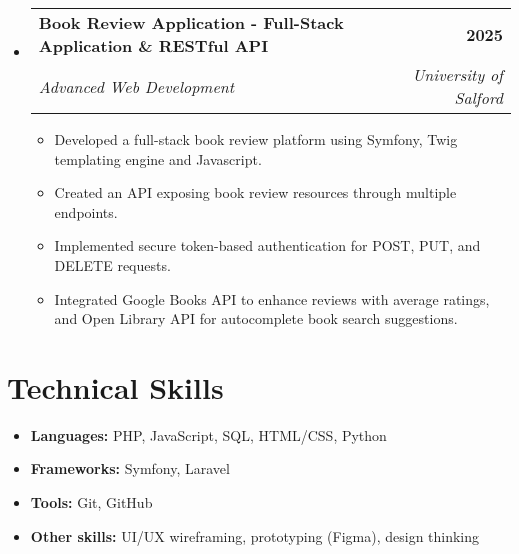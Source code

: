 \documentclass[a4paper,12pt]{article}
\makeatletter
\newcommand{\resumeSubHeadingListStart}{\begin{itemize}[leftmargin=0in, label={}]}
\newcommand{\resumeSubHeadingListEnd}{\end{itemize}}
\newcommand{\resumeSubheading}[4]{
  \item
    \begin{tabular*}{\textwidth}[t]{l@{\extracolsep{\fill}}r}
      \textbf{#1} & #2 \\
      \textit{#3} & \textit{#4} \\
    \end{tabular*}\vspace{-2pt}
}
\newcommand{\resumeItem}[1]{\item #1}
\newcommand{\resumeItemListStart}{\begin{itemize}[leftmargin=2em, label=\textbullet, itemsep=2pt]}
\newcommand{\resumeItemListEnd}{\end{itemize}}
\makeatother
\begin{document}
\pagebreak

\resumeSubHeadingListStart
    \resumeSubheading
    {Book Review Application - Full-Stack Application \& RESTful API}{\bfseries{2025}}
    {Advanced Web Development}{University of Salford}
        \resumeItemListStart
            \resumeItem{Developed a full-stack book review platform using Symfony, Twig templating engine and Javascript.}
            \resumeItem{Created an API exposing book review resources through multiple endpoints.}
            \resumeItem{Implemented secure token-based authentication for POST, PUT, and DELETE requests.}
            \resumeItem{Integrated Google Books API to enhance reviews with average ratings, and Open Library API for autocomplete book search suggestions.}
        \resumeItemListEnd
\resumeSubHeadingListEnd

\section{Technical Skills}
\resumeItemListStart
    \resumeItem{\textbf{Languages:} PHP, JavaScript, SQL, HTML/CSS, Python}
    \resumeItem{\textbf{Frameworks:} Symfony, Laravel}
    \resumeItem{\textbf{Tools:} Git, GitHub}
    \resumeItem{\textbf{Other skills:} UI/UX wireframing, prototyping (Figma), design thinking}
\resumeItemListEnd

\vfill
\end{document}
